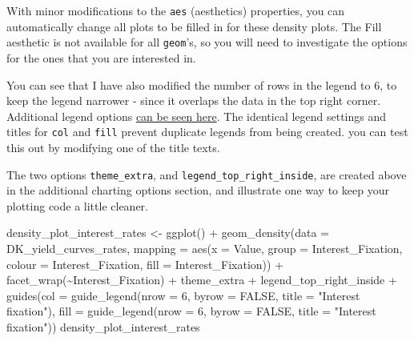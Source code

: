 \documentclass[
]{book}
\newenvironment{Shaded}{\begin{snugshade}}{\end{snugshade}}
\newcommand{\AttributeTok}[1]{\textcolor[rgb]{0.77,0.63,0.00}{#1}}
\newcommand{\ConstantTok}[1]{\textcolor[rgb]{0.00,0.00,0.00}{#1}}
\newcommand{\DecValTok}[1]{\textcolor[rgb]{0.00,0.00,0.81}{#1}}
\newcommand{\FunctionTok}[1]{\textcolor[rgb]{0.00,0.00,0.00}{#1}}
\newcommand{\NormalTok}[1]{#1}
\newcommand{\OtherTok}[1]{\textcolor[rgb]{0.56,0.35,0.01}{#1}}
\newcommand{\SpecialCharTok}[1]{\textcolor[rgb]{0.00,0.00,0.00}{#1}}
\newcommand{\StringTok}[1]{\textcolor[rgb]{0.31,0.60,0.02}{#1}}
\begin{document}
With minor modifications to the \texttt{aes} (aesthetics) properties, you can automatically change all plots to be filled in for these density plots. The Fill aesthetic is not available for all \texttt{geom}'s, so you will need to investigate the options for the ones that you are interested in.

You can see that I have also modified the number of rows in the legend to 6, to keep the legend narrower - since it overlaps the data in the top right corner. Additional legend options \href{https://ggplot2.tidyverse.org/reference/guide_legend.html}{can be seen here}. The identical legend settings and titles for \texttt{col} and \texttt{fill} prevent duplicate legends from being created. you can test this out by modifying one of the title texts.

The two options \texttt{theme\_extra}, and \texttt{legend\_top\_right\_inside}, are created above in the additional charting options section, and illustrate one way to keep your plotting code a little cleaner.

\begin{Shaded}
\begin{Highlighting}[]
\NormalTok{density\_plot\_interest\_rates }\OtherTok{\textless{}{-}} \FunctionTok{ggplot}\NormalTok{() }\SpecialCharTok{+} 
        \FunctionTok{geom\_density}\NormalTok{(}\AttributeTok{data =}\NormalTok{ DK\_yield\_curves\_rates,}
                     \AttributeTok{mapping =} \FunctionTok{aes}\NormalTok{(}\AttributeTok{x =}\NormalTok{ Value,}
                            \AttributeTok{group =}\NormalTok{ Interest\_Fixation,}
                            \AttributeTok{colour =}\NormalTok{ Interest\_Fixation,}
                            \AttributeTok{fill =}\NormalTok{ Interest\_Fixation)) }\SpecialCharTok{+}
    \FunctionTok{facet\_wrap}\NormalTok{(}\SpecialCharTok{\textasciitilde{}}\NormalTok{Interest\_Fixation) }\SpecialCharTok{+}
\NormalTok{    theme\_extra }\SpecialCharTok{+}
\NormalTok{    legend\_top\_right\_inside }\SpecialCharTok{+}
    \FunctionTok{guides}\NormalTok{(}\AttributeTok{col =} \FunctionTok{guide\_legend}\NormalTok{(}\AttributeTok{nrow =} \DecValTok{6}\NormalTok{, }
                              \AttributeTok{byrow =} \ConstantTok{FALSE}\NormalTok{,}
                              \AttributeTok{title =} \StringTok{"Interest fixation"}\NormalTok{),}
           \AttributeTok{fill =} \FunctionTok{guide\_legend}\NormalTok{(}\AttributeTok{nrow =} \DecValTok{6}\NormalTok{, }
                              \AttributeTok{byrow =} \ConstantTok{FALSE}\NormalTok{,}
                              \AttributeTok{title =} \StringTok{"Interest fixation"}\NormalTok{))}
\NormalTok{density\_plot\_interest\_rates}
\end{Highlighting}
\end{Shaded}
\end{document}
